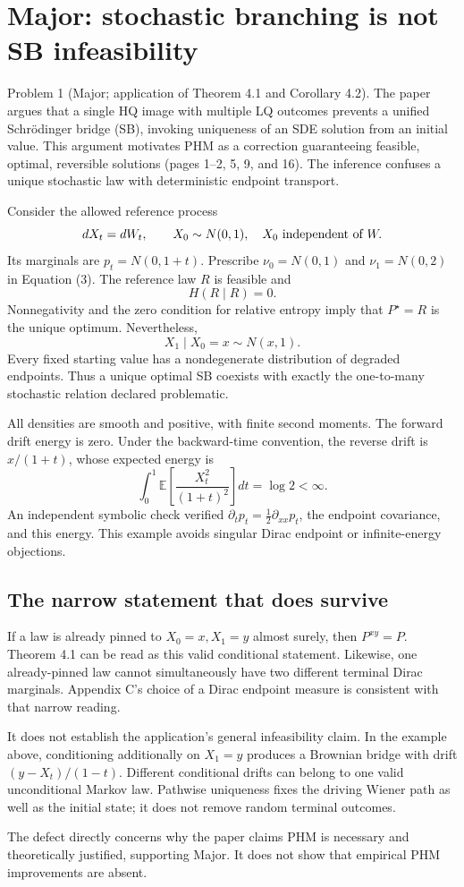 \documentclass[10pt]{article}
\begin{document}
\section*{Major: stochastic branching is not SB infeasibility}
Problem 1 (Major; application of Theorem 4.1 and Corollary 4.2).  The paper argues that a single HQ image with multiple LQ outcomes prevents a unified Schrödinger bridge (SB), invoking uniqueness of an SDE solution from an initial value. This argument motivates PHM as a correction guaranteeing feasible, optimal, reversible solutions (pages 1–2, 5, 9, and 16). The inference confuses a unique stochastic law with deterministic endpoint transport.\par
Consider the allowed reference process \[dX_t=dW_t,\qquad X_0\sim N(0,1),
 \quad X_0\ \hbox{independent of }W.\] Its marginals are \(p_t=N(0,1+t)\). Prescribe \(\nu_0=N(0,1)\) and \(\nu_1=N(0,2)\) in Equation (3). The reference law \(R\) is feasible and \[H(R\mid R)=0.\] Nonnegativity and the zero condition for relative entropy imply that \(P^\star=R\) is the unique optimum. Nevertheless, \[X_1\mid X_0=x\sim N(x,1).\] Every fixed starting value has a nondegenerate distribution of degraded endpoints. Thus a unique optimal SB coexists with exactly the one-to-many stochastic relation declared problematic.\par
All densities are smooth and positive, with finite second moments. The forward drift energy is zero. Under the backward-time convention, the reverse drift is \(x/(1+t)\), whose expected energy is \[\int_0^1\mathbb E\!\left[\frac{X_t^2}{(1+t)^2}\right]dt
 =\log2<\infty.\] An independent symbolic check verified \(\partial_t p_t=\tfrac12\partial_{xx}p_t\), the endpoint covariance, and this energy. This example avoids singular Dirac endpoint or infinite-energy objections.\par
\subsection*{The narrow statement that does survive}
If a law is already pinned to \(X_0=x,X_1=y\) almost surely, then \(P^{xy}=P\). Theorem 4.1 can be read as this valid conditional statement. Likewise, one already-pinned law cannot simultaneously have two different terminal Dirac marginals. Appendix C’s choice of a Dirac endpoint measure is consistent with that narrow reading.\par
It does not establish the application’s general infeasibility claim. In the example above, conditioning additionally on \(X_1=y\) produces a Brownian bridge with drift \((y-X_t)/(1-t)\). Different conditional drifts can belong to one valid unconditional Markov law. Pathwise uniqueness fixes the driving Wiener path as well as the initial state; it does not remove random terminal outcomes.\par
The defect directly concerns why the paper claims PHM is necessary and theoretically justified, supporting Major. It does not show that empirical PHM improvements are absent.\par
\end{document}
